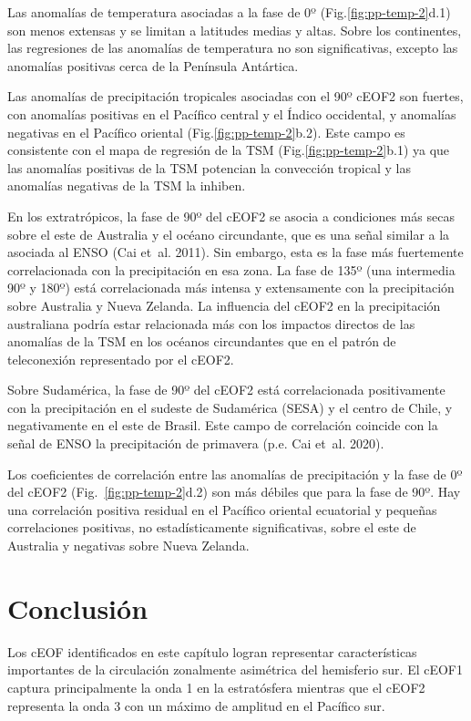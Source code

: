 \documentclass[12pt,oneside,a4paper]{reedthesis}
\begin{document}
Las anomalías de temperatura asociadas a la fase de 0º (Fig.\ref{fig:pp-temp-2}d.1) son menos extensas y se limitan a latitudes medias y altas.
Sobre los continentes, las regresiones de las anomalías de temperatura no son significativas, excepto las anomalías positivas cerca de la Península Antártica.

Las anomalías de precipitación tropicales asociadas con el 90º cEOF2 son fuertes, con anomalías positivas en el Pacífico central y el Índico occidental, y anomalías negativas en el Pacífico oriental (Fig.\ref{fig:pp-temp-2}b.2).
Este campo es consistente con el mapa de regresión de la TSM (Fig.\ref{fig:pp-temp-2}b.1) ya que las anomalías positivas de la TSM potencian la convección tropical y las anomalías negativas de la TSM la inhiben.

En los extratrópicos, la fase de 90º del cEOF2 se asocia a condiciones más secas sobre el este de Australia y el océano circundante, que es una señal similar a la asociada al ENSO (Cai et~al. 2011).
Sin embargo, esta es la fase más fuertemente correlacionada con la precipitación en esa zona.
La fase de 135º (una intermedia 90º y 180º) está correlacionada más intensa y extensamente con la precipitación sobre Australia y Nueva Zelanda.
La influencia del cEOF2 en la precipitación australiana podría estar relacionada más con los impactos directos de las anomalías de la TSM en los océanos circundantes que en el patrón de teleconexión representado por el cEOF2.

Sobre Sudamérica, la fase de 90º del cEOF2 está correlacionada positivamente con la precipitación en el sudeste de Sudamérica (SESA) y el centro de Chile, y negativamente en el este de Brasil.
Este campo de correlación coincide con la señal de ENSO la precipitación de primavera (p.e. Cai et~al. 2020).

Los coeficientes de correlación entre las anomalías de precipitación y la fase de 0º del cEOF2 (Fig.~\ref{fig:pp-temp-2}d.2) son más débiles que para la fase de 90º.
Hay una correlación positiva residual en el Pacífico oriental ecuatorial y pequeñas correlaciones positivas, no estadísticamente significativas, sobre el este de Australia y negativas sobre Nueva Zelanda.

\hypertarget{conclusiuxf3n}{%
\section{Conclusión}\label{conclusiuxf3n}}

Los cEOF identificados en este capítulo logran representar características importantes de la circulación zonalmente asimétrica del hemisferio sur.
El cEOF1 captura principalmente la onda 1 en la estratósfera mientras que el cEOF2 representa la onda 3 con un máximo de amplitud en el Pacífico sur.
\end{document}

